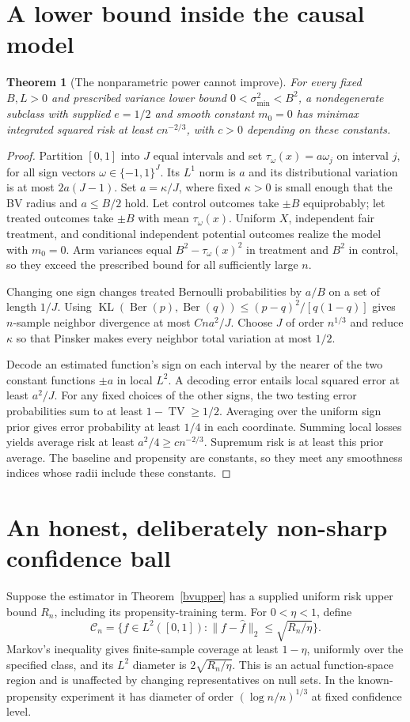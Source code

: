 \documentclass[11pt]{article}
\newtheorem{theorem}{Theorem}
\theoremstyle{remark}
\newcommand{\TV}{\operatorname{TV}}
\newcommand{\KL}{\operatorname{KL}}
\begin{document}
\section{A lower bound inside the causal model}
\begin{theorem}[The nonparametric power cannot improve]\label{bvlower}
For every fixed $B,L>0$ and prescribed variance lower bound $0<\sigma_{\min}^2<B^2$, a nondegenerate subclass with supplied $e=1/2$ and smooth constant $m_0=0$ has minimax integrated squared risk at least $c n^{-2/3}$, with $c>0$ depending on these constants.
\end{theorem}
\begin{proof}
Partition $[0,1]$ into $J$ equal intervals and set $\tau_\omega(x)=a\omega_j$ on interval $j$, for all sign vectors $\omega\in\{-1,1\}^J$. Its $L^1$ norm is $a$ and its distributional variation is at most $2a(J-1)$. Set $a=\kappa/J$, where fixed $\kappa>0$ is small enough that the BV radius and $a\leq B/2$ hold. Let control outcomes take $\pm B$ equiprobably; let treated outcomes take $\pm B$ with mean $\tau_\omega(x)$. Uniform $X$, independent fair treatment, and conditional independent potential outcomes realize the model with $m_0=0$. Arm variances equal $B^2-\tau_\omega(x)^2$ in treatment and $B^2$ in control, so they exceed the prescribed bound for all sufficiently large $n$.

Changing one sign changes treated Bernoulli probabilities by $a/B$ on a set of length $1/J$. Using
$\KL(\operatorname{Ber}(p),\operatorname{Ber}(q))\leq(p-q)^2/[q(1-q)]$ gives $n$-sample neighbor divergence at most $Cna^2/J$. Choose $J$ of order $n^{1/3}$ and reduce $\kappa$ so that Pinsker makes every neighbor total variation at most $1/2$.

Decode an estimated function's sign on each interval by the nearer of the two constant functions $\pm a$ in local $L^2$. A decoding error entails local squared error at least $a^2/J$. For any fixed choices of the other signs, the two testing error probabilities sum to at least $1-\TV\geq1/2$. Averaging over the uniform sign prior gives error probability at least $1/4$ in each coordinate. Summing local losses yields average risk at least $a^2/4\geq c n^{-2/3}$. Supremum risk is at least this prior average. The baseline and propensity are constants, so they meet any smoothness indices whose radii include these constants.
\end{proof}

\section{An honest, deliberately non-sharp confidence ball}
Suppose the estimator in Theorem~\ref{bvupper} has a supplied uniform risk upper bound $R_n$, including its propensity-training term. For $0<\eta<1$, define
\[
 \mathcal C_n=\{f\in L^2([0,1]):
             \|f-\widehat f\|_2\leq\sqrt{R_n/\eta}\}.
\]
Markov's inequality gives finite-sample coverage at least $1-\eta$, uniformly over the specified class, and its $L^2$ diameter is $2\sqrt{R_n/\eta}$. This is an actual function-space region and is unaffected by changing representatives on null sets. In the known-propensity experiment it has diameter of order $(\log n/n)^{1/3}$ at fixed confidence level.
\end{document}
